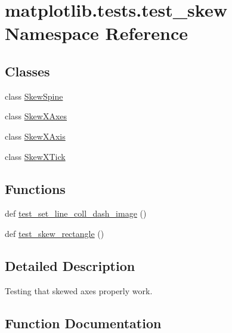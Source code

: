 \hypertarget{namespacematplotlib_1_1tests_1_1test__skew}{}\section{matplotlib.\+tests.\+test\+\_\+skew Namespace Reference}
\label{namespacematplotlib_1_1tests_1_1test__skew}
\subsection*{Classes}
\begin{DoxyCompactItemize}
\item 
class \hyperlink{classmatplotlib_1_1tests_1_1test__skew_1_1SkewSpine}{Skew\+Spine}
\item 
class \hyperlink{classmatplotlib_1_1tests_1_1test__skew_1_1SkewXAxes}{Skew\+X\+Axes}
\item 
class \hyperlink{classmatplotlib_1_1tests_1_1test__skew_1_1SkewXAxis}{Skew\+X\+Axis}
\item 
class \hyperlink{classmatplotlib_1_1tests_1_1test__skew_1_1SkewXTick}{Skew\+X\+Tick}
\end{DoxyCompactItemize}
\subsection*{Functions}
\begin{DoxyCompactItemize}
\item 
def \hyperlink{namespacematplotlib_1_1tests_1_1test__skew_af929ccb968f247e33f50c811da5d758d}{test\+\_\+set\+\_\+line\+\_\+coll\+\_\+dash\+\_\+image} ()
\item 
def \hyperlink{namespacematplotlib_1_1tests_1_1test__skew_a1079648a509757a5161703405d225dd2}{test\+\_\+skew\+\_\+rectangle} ()
\end{DoxyCompactItemize}


\subsection{Detailed Description}
\begin{DoxyVerb}Testing that skewed axes properly work.
\end{DoxyVerb}
 

\subsection{Function Documentation}
\mbox{\label{namespacematplotlib_1_1tests_1_1test__skew_af929ccb968f247e33f50c811da5d758d}} 
